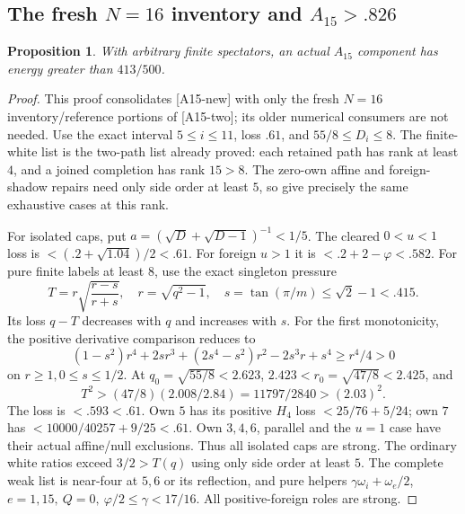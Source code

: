 \documentclass[11pt]{article}
\newtheorem{proposition}[theorem]{Proposition}
\theoremstyle{definition}
\theoremstyle{remark}
\newcommand{\src}[1]{\textnormal{\textsf{[#1]}}}
\begin{document}
\subsection{The fresh \(N=16\) inventory and \(A_{15}>.826\)}
\label{app:A15}
\begin{proposition}
With arbitrary finite spectators, an actual \(A_{15}\)
component has energy greater than \(413/500\).
\end{proposition}
\begin{proof}
This proof consolidates \src{A15-new} with only the fresh
\(N=16\) inventory/reference portions of \src{A15-two}; its older
numerical consumers are not needed.
Use the exact interval \(5\leq i\leq11\), loss \(.61\),
and \(55/8\leq D_i\leq8\).
The finite-white list is the two-path list already
proved: each retained path has rank at least \(4\),
and a joined completion has rank \(15>8\).
The zero-own affine and foreign-shadow repairs need
only side order at least \(5\), so give precisely
the same exhaustive cases at this rank.

For isolated caps, put
\(a=(\sqrt D+\sqrt{D-1})^{-1}<1/5\).
The cleared \(0<u<1\) loss is
\(<(.2+\sqrt{1.04})/2<.61\).
For foreign \(u>1\) it is
\(<.2+2-\varphi<.582\).
For pure finite labels at least \(8\), use the
exact singleton pressure
\[
 T=r\sqrt{\frac{r-s}{r+s}},\quad
 r=\sqrt{q^2-1},\quad
 s=\tan(\pi/m)\leq\sqrt2-1<.415.
\]
Its loss \(q-T\) decreases with \(q\) and increases
with \(s\). For the first monotonicity, the
positive derivative comparison reduces to
\[
 (1-s^2)r^4+2sr^3+(2s^4-s^2)r^2-2s^3r+s^4
 \geq r^4/4>0
\]
on \(r\geq1,0\leq s\leq1/2\).
At \(q_0=\sqrt{55/8}<2.623\),
\(2.423<r_0=\sqrt{47/8}<2.425\), and
\[
 T^2>(47/8)(2.008/2.84)=11797/2840>(2.03)^2.
\]
The loss is \(<.593<.61\).
Own \(5\) has its positive \(H_4\) loss
\(<25/76+5/24\); own \(7\) has
\(<10000/40257+9/25<.61\).
Own \(3,4,6\), parallel and the \(u=1\)
case have their actual affine/null exclusions.
Thus all isolated caps are strong.
The ordinary white ratios exceed \(3/2>T(q)\)
using only side order at least \(5\).
The complete weak list is near-four at \(5,6\)
or its reflection, and pure helpers
\(\gamma\omega_i+\omega_e/2\),
\(e=1,15,\ Q=0,\ \varphi/2\leq\gamma<17/16\).
All positive-foreign roles are strong.


\end{proof}
\end{document}
